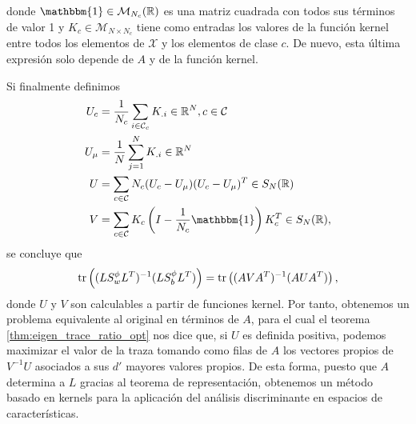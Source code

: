 donde $\mathbbm{1} \in \mathcal{M}_{N_c}(\R)$ es una matriz cuadrada con todos sus términos de valor 1 y $K_c \in \mathcal{M}_{N\times N_c}$ tiene como entradas los valores de la función kernel entre todos los elementos de $\mathcal{X}$ y los elementos de clase $c$. De nuevo, esta última expresión solo depende de $A$ y de la función kernel.

Si finalmente definimos
\begin{equation*}
    \begin{split}
        U_c &= \frac{1}{N_c}\sum_{i \in \mathcal{C}_c}K_{.i} \in \R^N, c \in \mathcal{C}\\
        U_{\mu} &= \frac{1}{N}\sum_{j=1}^N K_{.i} \in \R^N \\
        U &= \sum_{c \in \mathcal{C}} N_c(U_c - U_{\mu})(U_c - U_{\mu})^T \in S_N(\R) \\
        V &= \sum_{c \in \mathcal{C}} K_c\left(I - \frac{1}{N_c}\mathbbm{1}\right)K_c^T \in S_N(\R),
    \end{split}
\end{equation*}
se concluye que
\begin{equation*}
    \operatorname{tr}\left((L S_w^{\phi} L^T)^{-1}(LS_b^{\phi}L^T)\right) = \operatorname{tr}\left((AVA^T)^{-1}(AUA^T) \right),
\end{equation*}
donde $U$ y $V$ son calculables a partir de funciones kernel. Por tanto, obtenemos un problema equivalente al original en términos de $A$, para el cual el teorema \ref{thm:eigen_trace_ratio_opt} nos dice que, si $U$ es definida positiva, podemos maximizar el valor de la traza tomando como filas de $A$ los vectores propios de $V^{-1}U$ asociados a sus $d'$ mayores valores propios. De esta forma, puesto que $A$ determina a $L$ gracias al teorema de representación, obtenemos un método basado en kernels para la aplicación del análisis discriminante en espacios de características.
